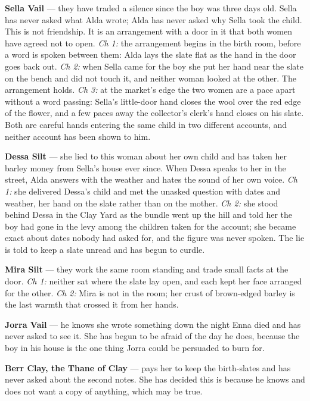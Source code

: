 \documentclass{design/chronicle}
\begin{document}
{\textbf{Sella Vail} — they have traded a silence since the boy was three days old. Sella has never asked what Alda wrote; Alda has never asked why Sella took the child. This is not friendship. It is an arrangement with a door in it that both women have agreed not to open. \emph{Ch 1:} the arrangement begins in the birth room, before a word is spoken between them: Alda lays the slate flat as the hand in the door goes back out. \emph{Ch 2:} when Sella came for the boy she put her hand near the slate on the bench and did not touch it, and neither woman looked at the other. The arrangement holds. \emph{Ch 3:} at the market’s edge the two women are a pace apart without a word passing: Sella’s little-door hand closes the wool over the red edge of the flower, and a few paces away the collector’s clerk’s hand closes on his slate. Both are careful hands entering the same child in two different accounts, and neither account has been shown to him.

\textbf{Dessa Silt} — she lied to this woman about her own child and has taken her barley money from Sella’s house ever since. When Dessa speaks to her in the street, Alda answers with the weather and hates the sound of her own voice. \emph{Ch 1:} she delivered Dessa’s child and met the unasked question with dates and weather, her hand on the slate rather than on the mother. \emph{Ch 2:} she stood behind Dessa in the Clay Yard as the bundle went up the hill and told her the boy had gone in the levy among the children taken for the account; she became exact about dates nobody had asked for, and the figure was never spoken. The lie is told to keep a slate unread and has begun to curdle.

\textbf{Mira Silt} — they work the same room standing and trade small facts at the door. \emph{Ch 1:} neither sat where the slate lay open, and each kept her face arranged for the other. \emph{Ch 2:} Mira is not in the room; her crust of brown-edged barley is the last warmth that crossed it from her hands.

\textbf{Jorra Vail} — he knows she wrote something down the night Enna died and has never asked to see it. She has begun to be afraid of the day he does, because the boy in his house is the one thing Jorra could be persuaded to burn for.

\textbf{Berr Clay, the Thane of Clay} — pays her to keep the birth-slates and has never asked about the second notes. She has decided this is because he knows and does not want a copy of anything, which may be true.

}
\end{document}
